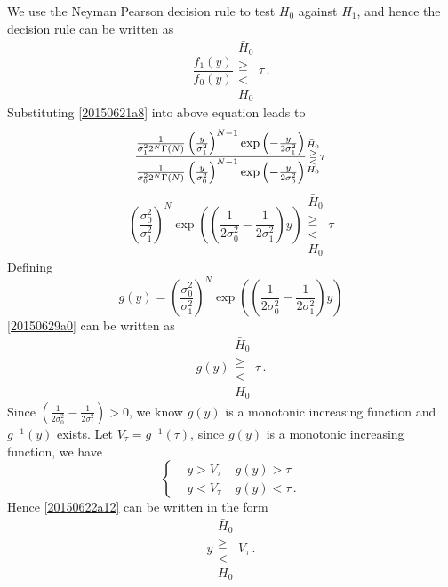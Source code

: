 We use the Neyman Pearson decision rule to test $H_0$ against $H_1$, and hence the decision rule can be written as
\begin{equation}
  \frac{f_1(y)}{f_0(y)} \substack{\bar{H}_0 \\ \geq \\ < \\ H_0} \tau\,.
\end{equation}
Substituting \eqref{20150621a8} into above equation leads to 
\begin{equation}
  \frac{\CHISQUY[\sigma_1^2]}{\CHISQUY[\sigma_0^2]}\substack{\bar{H}_0 \\ \geq \\ < \\ H_0} \tau
\end{equation}
\begin{equation}
  \left(\frac{\sigma_0^2}{\sigma_1^2}\right)^N\exp\left( (\frac{1}{2\sigma_0^2} -  \frac{1}{2\sigma_1^2}  )y \right)\substack{\bar{H}_0 \\ \geq \\ < \\ H_0} \tau
\end{equation}
Defining 
\begin{equation}
  g(y) = \left(\frac{\sigma_0^2}{\sigma_1^2}\right)^N\exp\left( (\frac{1}{2\sigma_0^2} -  \frac{1}{2\sigma_1^2}  )y \right)
  \label{20150629a0}
\end{equation}
\eqref{20150629a0} can be written as
\begin{equation}
  g(y) \substack{\bar{H}_0 \\ \geq \\ < \\ H_0} \tau\,.
  \label{20150622a12}
\end{equation}
Since $(\frac{1}{2\sigma_0^2} -  \frac{1}{2\sigma_1^2}  ) >  0$, we know $g(y)$ is a monotonic increasing function and $g^{-1}(y) $ exists.  
Let $V_\tau = g^{-1}(\tau)$, since $g(y)$ is a monotonic increasing function, we have 
\begin{equation}
  \begin{cases}
    &y > V_\tau\;\;\;\;g(y) > \tau\\
    &y < V_\tau\;\;\;\;g(y) < \tau\,.
  \end{cases}
\end{equation}
Hence \eqref{20150622a12} can be written in the form 
\begin{equation}
  y  \substack{\bar{H}_0 \\ \geq \\ < \\ H_0} V_\tau\,.
  \label{20150622a22}
\end{equation}
